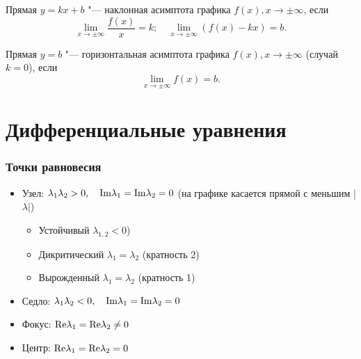 \textbullet \quad
Прямая $y=kx+b$ "--- наклонная асимптота графика $f(x), x\to\pm\infty$, если $$\lim\limits_{x\to\pm\infty}\frac{f(x)}{x}=k; \quad \lim\limits_{x\to\pm\infty} (f(x)-kx)=b.$$

\textbullet \quad
Прямая $y=b$ "--- горизонтальная асимптота графика $f(x), x\to\pm\infty$ (случай $k=0$), если $$ \lim\limits_{x\to\pm\infty} f(x)=b.$$


\section{Дифференциальные уравнения}
\subsubsection {Точки равновесия}

\begin{itemize}
	\item
	Узел: $\lambda _1 \lambda _2 > 0, \quad \rm{Im}\lambda _1 = \rm{Im}\lambda _2 = 0$ (на графике касается прямой с меньшим |$\lambda$|)
	
	\begin{itemize}
		\item Устойчивый $\lambda _{1,2} < 0$)
		
		\item Дикритический $\lambda _1 = \lambda _2$ (кратность 2)
		
		\item Вырожденный $\lambda _1 = \lambda _2$ (кратность 1)
	\end{itemize}
	
	\item
	Седло: $\lambda _1 \lambda _2 < 0, \quad \rm{Im}\lambda _1 = \rm{Im}\lambda _2 = 0$ 
	
	\item
	Фокус: $\rm{Re}\lambda _1 = \rm{Re}\lambda _2 \ne 0$ 
	
	\item
	Центр: $\rm{Re}\lambda _1 = \rm{Re}\lambda _2 = 0$ 
\end{itemize}

\resetHeadWidth
\newpage

